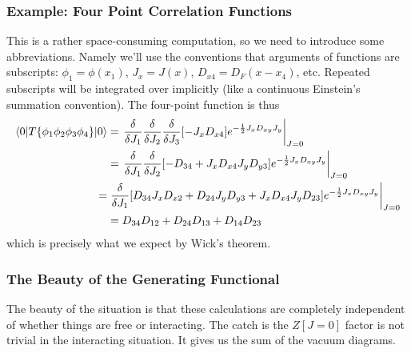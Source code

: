 \subsubsection{Example: Four Point Correlation Functions}

This is a rather space-consuming computation, so we need to
introduce some abbreviations. Namely we'll use the conventions
that arguments of functions are subscripts: $\phi_1 = \phi(x_1)$,
$J_x=J(x)$, $D_{x4}=D_{F}(x-x_{4})$, etc. Repeated subscripts
will be integrated over implicitly (like a continuous Einstein's
summation convention). The four-point function is thus
\begin{subequations}
\begin{align}
\langle0|T\{\phi_1\phi_2\phi_3\phi_4\}|0\rangle 
&=\left. \frac{\delta}{\delta J_{1}}
\frac{\delta}{\delta J_{2}}
\frac{\delta}{\delta J_{3}}
[-J_{x}D_{x4}]e^{-\frac{1}{2}J_{x}D_{xy}J_{y}}\right|_{J=0}\\
&=\left. \frac{\delta}{\delta J_{1}}
\frac{\delta}{\delta J_{2}}
[-D_{34}+J_{x}D_{x4}J_{y}D_{y3}]e^{-\frac{1}{2}J_{x}D_{xy}J_{y}}\right|_{J=0}\\
=&\left. \frac{\delta}{\delta J_{1}}
[D_{34}J_{x}D_{x2}+D_{24}J_{y}D_{y3}+J_{x}D_{x4}J_{y}D_{23}]e^{-\frac{1}{2}J_{x}D_{xy}J_{y}}\right|_{J=0}\\
&=D_{34}D_{12}+D_{24}D_{13}+D_{14}D_{23}
\end{align}
\end{subequations}
which is precisely what we expect by Wick's theorem.

\subsubsection{The Beauty of the Generating Functional}

The beauty of the situation is that these calculations are
completely independent of whether things are free or
interacting. The catch is the $Z[J=0]$ factor is not trivial in
the interacting situation. It gives us the sum of the vacuum
diagrams.
